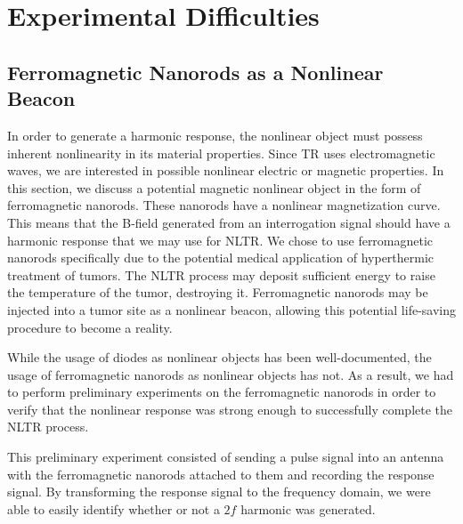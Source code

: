 \section{Experimental Difficulties}
\label{sec:nltr-expr-diff}

\subsection{Ferromagnetic Nanorods as a Nonlinear Beacon}

In order to generate a harmonic response, the nonlinear object must possess inherent nonlinearity in its material properties. Since TR uses electromagnetic waves, we are interested in possible nonlinear electric or magnetic properties. In this section, we discuss a potential magnetic nonlinear object in the form of ferromagnetic nanorods. These nanorods have a nonlinear magnetization curve. This means that the B-field generated from an interrogation signal should have a harmonic response that we may use for NLTR. We chose to use ferromagnetic nanorods specifically due to the potential medical application of hyperthermic treatment of tumors. The NLTR process may deposit sufficient energy to raise the temperature of the tumor, destroying it. Ferromagnetic nanorods may be injected into a tumor site as a nonlinear beacon, allowing this potential life-saving procedure to become a reality. 

While the usage of diodes as nonlinear objects has been well-documented, the usage of ferromagnetic nanorods as nonlinear objects has not. As a result, we had to perform preliminary experiments on the ferromagnetic nanorods in order to verify that the nonlinear response was strong enough to successfully complete the NLTR process.

This preliminary experiment consisted of sending a pulse signal into an antenna with the ferromagnetic nanorods attached to them and recording the response signal. By transforming the response signal to the frequency domain, we were able to easily identify whether or not a $2f$ harmonic was generated.

